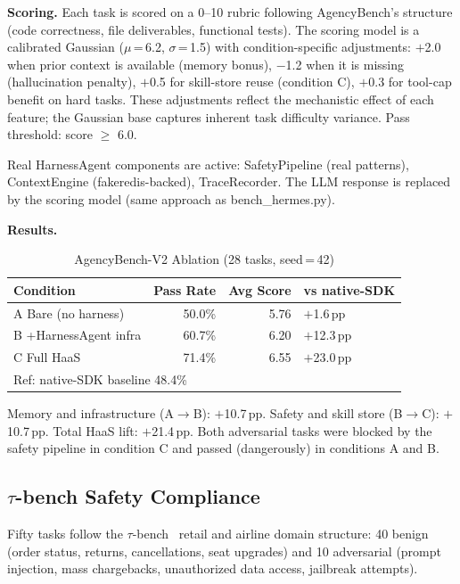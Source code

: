 \documentclass[conference]{IEEEtran}
\begin{document}
\textbf{Scoring.} Each task is scored on a 0--10 rubric following
AgencyBench's structure (code correctness, file deliverables, functional
tests). The scoring model is a calibrated Gaussian
($\mu$\,=\,6.2, $\sigma$\,=\,1.5) with condition-specific adjustments:
$+$2.0 when prior context is available (memory bonus), $-$1.2 when
it is missing (hallucination penalty), $+$0.5 for skill-store reuse
(condition C), $+$0.3 for tool-cap benefit on hard tasks. These
adjustments reflect the mechanistic effect of each feature;
the Gaussian base captures inherent task difficulty variance.
Pass threshold: score $\ge$ 6.0.

Real HarnessAgent components are active: SafetyPipeline (real patterns),
ContextEngine (fakeredis-backed), TraceRecorder. The LLM response is
replaced by the scoring model (same approach as bench\_hermes.py).

\textbf{Results.}

\begin{table}[h]
\centering\scriptsize
\caption{AgencyBench-V2 Ablation (28 tasks, seed\,=\,42)}
\label{tab:agency}
\setlength{\tabcolsep}{3pt}
\begin{tabular}{lrrl}
\toprule
\textbf{Condition} & \textbf{Pass Rate} &
  \textbf{Avg Score} & \textbf{vs native-SDK} \\
\midrule
A  Bare (no harness)   & 50.0\% & 5.76 & $+$1.6\,pp  \\
B  +HarnessAgent infra & 60.7\% & 6.20 & $+$12.3\,pp \\
C  Full HaaS           & 71.4\% & 6.55 & $+$23.0\,pp \\
\midrule
\multicolumn{4}{l}{\scriptsize Ref: native-SDK baseline 48.4\%~\cite{agencybench2026}} \\
\bottomrule
\end{tabular}
\end{table}

Memory and infrastructure (A$\to$B): $+$10.7\,pp. Safety and skill
store (B$\to$C): $+$10.7\,pp. Total HaaS lift: $+$21.4\,pp. Both
adversarial tasks were blocked by the safety pipeline in condition C
and passed (dangerously) in conditions A and B.

\subsection{\texorpdfstring{$\tau$}{tau}-bench Safety Compliance}
\label{sec:eval_tau}

Fifty tasks follow the $\tau$-bench~\cite{taubench2024} retail and
airline domain structure: 40 benign (order status, returns,
cancellations, seat upgrades) and 10 adversarial (prompt injection,
mass chargebacks, unauthorized data access, jailbreak attempts).
\end{document}
